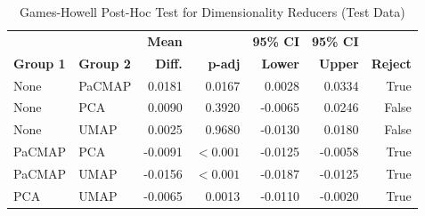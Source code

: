 \begin{table}[!htbp]
    \captionsetup{skip=5pt}
\centering
\caption{Games-Howell Post-Hoc Test for Dimensionality Reducers (Test Data)}
\label{tbl:games_howell_dim_reducer_full}
        \begin{tabular}{llrrrrr}
            \toprule
             &  & \textbf{Mean} &  & \textbf{95\% CI} & \textbf{95\% CI} & \\
            \textbf{Group 1} & \textbf{Group 2} & \textbf{Diff.} & \textbf{p-adj} & \textbf{Lower} & \textbf{Upper} & \textbf{Reject}\\
\midrule
None & PaCMAP & 0.0181 & 0.0167 & 0.0028 & 0.0334 & True \\
None & PCA & 0.0090 & 0.3920 & -0.0065 & 0.0246 & False \\
None & UMAP & 0.0025 & 0.9680 & -0.0130 & 0.0180 & False \\
PaCMAP & PCA & -0.0091 & \(<0.001\) & -0.0125 & -0.0058 & True \\
PaCMAP & UMAP & -0.0156 & \(<0.001\) & -0.0187 & -0.0125 & True \\
PCA & UMAP & -0.0065 & 0.0013 & -0.0110 & -0.0020 & True \\
\bottomrule
\end{tabular}
\end{table}

\begin{table}[!htbp]
    \captionsetup{skip=5pt}
\centering
\caption{Descriptive Statistics for F1-Scores by Number of Dimensions (Test Data)}
\label{tbl:desc_stats_num_dim}
\end{table}

